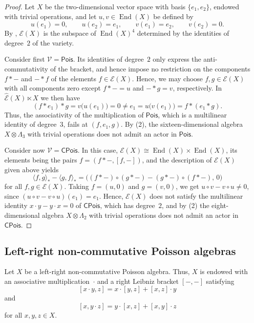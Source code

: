 \documentclass[reqno,a4paper]{amsart}
\theoremstyle{plain}
\theoremstyle{definition}
\theoremstyle{remark}
\numberwithin{equation}{section}
\newcommand{\E}{\mathcal{E}}
\newcommand{\V}{\mathcal{V}}
\DeclareMathOperator{\End}{End}
\newcommand{\Pois}{\ensuremath{\mathsf{Pois}}}
\newcommand{\CPois}{\ensuremath{\mathsf{CPois}}}
\begin{document}
\begin{proof}
Let $X$ be the two-dimensional vector space with basis $\{e_1,e_2\}$, endowed with trivial operations, and let $u,v\in\End(X)$ be defined by
\[
u(e_1)=0,\qquad u(e_2)=e_1,\qquad v(e_1)=e_2,\qquad v(e_2)=0.
\]
By , $\E(X)$ is the subspace of $\End(X)^4$ determined by the identities of degree~$2$ of the variety.

Consider first $\V=\Pois$. Its identities of degree~$2$ only express the anti-commutativity of the bracket, and hence impose no restriction on the components $f\ast-$ and $-\ast f$ of the elements $f\in\E(X)$. Hence, we may choose $f,g\in\E(X)$ with all components zero except $f\ast-=u$ and $-\ast g=v$, respectively. In $\widehat{\E}(X)\ltimes X$ we then have
\[
(f\ast e_1)\ast g=v\bigl(u(e_1)\bigr)=0\neq e_1=u\bigl(v(e_1)\bigr)=f\ast(e_1\ast g).
\]
Thus, the associativity of the multiplication of $\Pois$, which is a multilinear identity of degree~$3$, fails at $(f,e_1,g)$. By (2), the sixteen-dimensional algebra $X\otimes\Lambda_3$ with trivial operations does not admit an actor in $\Pois$.

Consider now $\V=\CPois$. In this case, $\E(X)\cong\End(X)\times\End(X)$, its elements being the pairs $f=(f\ast-,[f,-])$, and the description of $\E(X)$ given above yields
\[
\langle f,g\rangle_\ast-\langle g,f\rangle_\ast=\bigl((f\ast-)\circ(g\ast-)-(g\ast-)\circ(f\ast-),\,0\bigr)
\]
for all $f,g\in\E(X)$. Taking $f=(u,0)$ and $g=(v,0)$, we get $u\circ v-v\circ u\neq0$, since $(u\circ v-v\circ u)(e_1)=e_1$. Hence, $\E(X)$ does not satisfy the multilinear identity $x\cdot y-y\cdot x=0$ of $\CPois$, which has degree~$2$, and by (2) the eight-dimensional algebra $X\otimes\Lambda_2$ with trivial operations does not admit an actor in~$\CPois$.
\end{proof}

\subsection{Left-right non-commutative Poisson algebras}\label{SecExternalNPlr}

Let $X$ be a left-right non-commutative Poisson algebra. Thus, $X$ is endowed with an associative multiplication~$\cdot$ and a right Leibniz bracket $[-,-]$ satisfying
\[
[x\cdot y,z]=x\cdot[y,z]+[x,z]\cdot y
\]
and
\[
[x,y\cdot z]=y\cdot[x,z]+[x,y]\cdot z
\]
for all $x,y,z\in X$.
\end{document}
